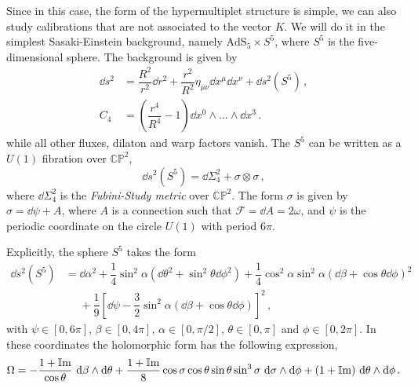 \documentclass[debug]{phd}
\begin{document}
Since in this case, the form of the hypermultiplet structure is simple, we can also study calibrations that are not associated to the vector $K$. 
We will do it in the simplest Sasaki-Einstein background, namely $\mathrm{AdS}_5 \times S^5$, where $S^5$ is the five-dimensional sphere. 
The background is given by
%
	\begin{equation} 
	\label{ads5bkgrd}
		\begin{split}
			\dd  s^2 &= \dfrac{R^2}{r^2} \dd  r^2 + \dfrac{r^2}{R^2} \eta_{\mu\nu} \dd  x^\mu \dd  x^\nu + \dd  s^2(S^5)\, , \\[1mm]
			C_4 &= \left(\dfrac{r^4}{R^4} - 1\right) \dd  x^0 \wedge \ldots \wedge \dd  x^3\, .
		\end{split}
	\end{equation} 
%
while all other fluxes, dilaton and warp factors vanish.
The $S^5$ can be written as a $U(1)$ fibration over $\mathbb{CP}^2$,
%
	\begin{equation} 
		\dd  s^2(S^5) = \dd  \Sigma_{4}^2 + \sigma \otimes \sigma\, ,
	\end{equation} 
%
where $\dd  \Sigma_{4}^2$ is the \emph{Fubini-Study metric} over $\mathbb{CP}^2$. The form $\sigma$ is given by $\sigma = \dd  \psi + A$, where $A$ is a connection such that $\mathcal{F} = \dd  A = 2 \omega$, and $\psi$ is the periodic coordinate on the circle $U(1)$ with period $6\pi$.

Explicitly, the sphere $S^5$ takes the form~\cite{Gauntlett:2004yd}
%
	\begin{equation} 
		\begin{split}
			\dd  s^2(S^5) &= \dd  \alpha ^2 + \dfrac{1}{4} \sin^2 \alpha  (\dd  \theta^2 + \sin^2 \theta \dd  \phi^2) + \dfrac{1}{4} \cos^2 \alpha  \sin^2\alpha  (\dd  \beta + \cos\theta \dd  \phi)^2 \\
				 & \phantom{=} + \dfrac{1}{9}\left[\dd  \psi - \dfrac{3}{2}\sin^2\alpha  (\dd  \beta + \cos\theta \dd  \phi)\right]^2\, ,
		\end{split}
	\end{equation} 
%
with $\psi \in [0,6\pi]$, $\beta \in [0,4\pi]$, $\alpha  \in [0,\pi/2]$, $\theta \in [0,\pi]$ and $\phi \in [0,2\pi]$.
In these coordinates the holomorphic form has the following expression,
%
	\begin{equation} 
		\Omega= - \frac{1+\IIm}{\cos \theta}\ \dd  \beta \wedge \dd  \theta + \frac{1+\IIm}{8} \cos \sigma \cos \theta \sin \theta \sin^3 \sigma\ \dd  \sigma \wedge \dd  \phi + (1+\IIm)\ \dd  \theta \wedge \dd  \phi\, .
	\end{equation} 
%
\end{document}
